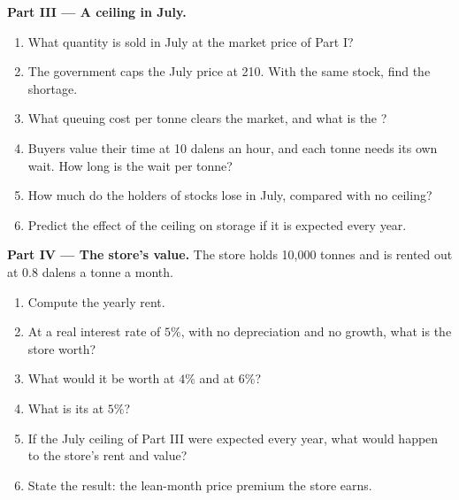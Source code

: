 \begin{problem}
\medskip\noindent\textbf{Part III --- A ceiling in July.}
\begin{enumerate}[resume]
  \item What quantity is sold in July at the market price of Part I?
  \item The government caps the July price at 210. With the same stock, find the shortage.
  \item What queuing cost per tonne clears the market, and what is the ?
  \item Buyers value their time at 10 dalens an hour, and each tonne needs its own wait. How long is the wait per tonne?
  \item How much do the holders of stocks lose in July, compared with no ceiling?
  \item Predict the effect of the ceiling on storage if it is expected every year.
\end{enumerate}

\medskip\noindent\textbf{Part IV --- The store's value.} The store holds
10,000 tonnes and is rented out at 0.8 dalens a tonne a month.
\begin{enumerate}[resume]
  \item Compute the yearly rent.
  \item At a real interest rate of $5\%$, with no depreciation and no growth, what is the store worth?
  \item What would it be worth at $4\%$ and at $6\%$?
  \item What is its  at $5\%$?
  \item If the July ceiling of Part III were expected every year, what would happen to the store's rent and value?
  \item State the result: the lean-month price premium the store earns.
\end{enumerate}
\end{problem}
